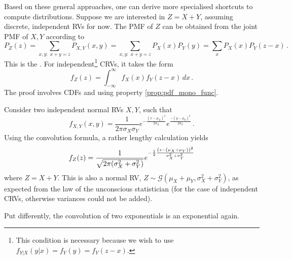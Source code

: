 Based on these general approaches, one can derive more specialised shortcuts to compute distributions. Suppose we are interested in $Z = X + Y$, assuming discrete, independent RVs for now. The PMF of $Z$ can be obtained from the joint PMF of $X, Y$ according to
\begin{equation}
P_Z(z) = \sum_{x, y: \; x + y = z} P_{X, Y}(x, y) = \sum_{x, y: \; x + y = z} P_X(x) P_Y(y) = \sum_x P_X(x) P_Y(z - x) \, .%
\end{equation}
This is the . For independent\footnote{This condition is necessary because we wish to use $f_{Y | X}(y | x) = f_Y(y) = f_Y(z - x)$.} CRVs, it takes the form
\begin{equation}
f_Z(z) = \int_{- \infty}^\infty f_X(x) f_Y(z - x) \, dx \, .
\end{equation}
The proof involves CDFs and using property \ref{prop:pdf_mono_func}.










\begin{ex}
Consider two independent normal RVs $X, Y$, such that
\begin{equation*}
f_{X, Y}(x, y) = \frac{1}{2\pi \sigma_X \sigma_Y} e^{- \frac{(x - \mu_X)^2}{2 \sigma_X}} e^{\frac{- (y - \mu_Y)^2}{2 \sigma_Y}} \, .
\end{equation*}
Using the convolution formula, a rather lengthy calculation yields
\begin{equation}
f_Z(z) = \frac{1}{\sqrt{2 \pi \qty(\sigma_X^2 + \sigma_Y^2)}} e^{- \frac{1}{2} \frac{\qty(z - \qty(\mu_X + \mu_Y))^2}{\sigma_X^2 + \sigma_Y^2}}
\end{equation}
where $Z = X + Y$. This is also a normal RV, $Z \sim \mathcal{G}(\mu_X + \mu_Y, \sigma_X^2 + \sigma_Y^2)$, as expected from the law of the unconscious statistician (for the case of independent CRVs, otherwise variances could not be added).

Put differently, the convolution of two exponentials is an exponential again.
\end{ex}


